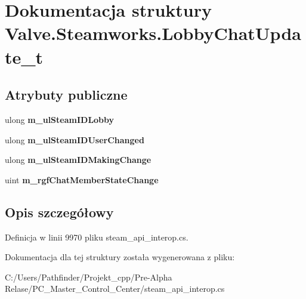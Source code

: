 \hypertarget{struct_valve_1_1_steamworks_1_1_lobby_chat_update__t}{}\section{Dokumentacja struktury Valve.\+Steamworks.\+Lobby\+Chat\+Update\+\_\+t}
\label{struct_valve_1_1_steamworks_1_1_lobby_chat_update__t}
\subsection*{Atrybuty publiczne}
\begin{DoxyCompactItemize}
\item 
\mbox{\label{struct_valve_1_1_steamworks_1_1_lobby_chat_update__t_ab5fe695c1dbd0459392e58ead3012100}} 
ulong {\bfseries m\+\_\+ul\+Steam\+I\+D\+Lobby}
\item 
\mbox{\label{struct_valve_1_1_steamworks_1_1_lobby_chat_update__t_a162d5099b3bff6896112faf96eb7ed58}} 
ulong {\bfseries m\+\_\+ul\+Steam\+I\+D\+User\+Changed}
\item 
\mbox{\label{struct_valve_1_1_steamworks_1_1_lobby_chat_update__t_a281811ac1acc31c66fd17385440a6720}} 
ulong {\bfseries m\+\_\+ul\+Steam\+I\+D\+Making\+Change}
\item 
\mbox{\label{struct_valve_1_1_steamworks_1_1_lobby_chat_update__t_a039d7735d14130073dff62fdc61c43a8}} 
uint {\bfseries m\+\_\+rgf\+Chat\+Member\+State\+Change}
\end{DoxyCompactItemize}


\subsection{Opis szczegółowy}


Definicja w linii 9970 pliku steam\+\_\+api\+\_\+interop.\+cs.



Dokumentacja dla tej struktury została wygenerowana z pliku\+:\begin{DoxyCompactItemize}
\item 
C\+:/\+Users/\+Pathfinder/\+Projekt\+\_\+cpp/\+Pre-\/\+Alpha Relase/\+P\+C\+\_\+\+Master\+\_\+\+Control\+\_\+\+Center/steam\+\_\+api\+\_\+interop.\+cs\end{DoxyCompactItemize}

